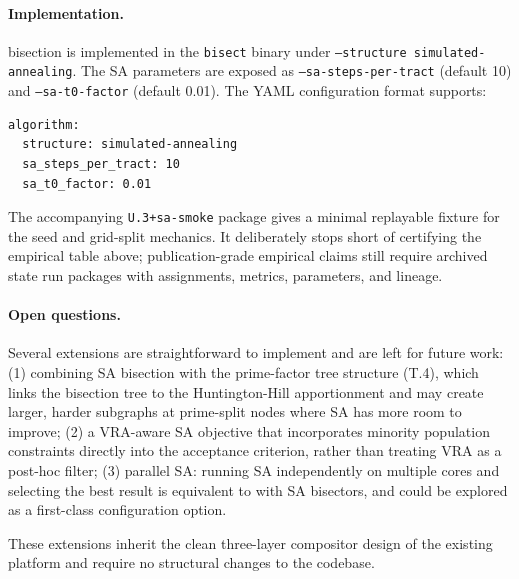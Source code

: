 \paragraph{Implementation.}
\sa{} bisection is implemented in the \texttt{bisect} binary under
\texttt{--structure simulated-annealing}.
The SA parameters are exposed as \texttt{--sa-steps-per-tract} (default 10)
and \texttt{--sa-t0-factor} (default 0.01).
The YAML configuration format supports:
\begin{verbatim}
algorithm:
  structure: simulated-annealing
  sa_steps_per_tract: 10
  sa_t0_factor: 0.01
\end{verbatim}
The accompanying \texttt{U.3+sa-smoke} package gives a minimal replayable
fixture for the seed and grid-split mechanics.  It deliberately stops short of
certifying the empirical table above; publication-grade empirical claims still
require archived state run packages with assignments, metrics, parameters, and
lineage.

\paragraph{Open questions.}
Several extensions are straightforward to implement and are left for future work:
(1) combining SA bisection with the \ar{} prime-factor tree structure (T.4),
    which links the bisection tree to the Huntington-Hill apportionment and
    may create larger, harder subgraphs at prime-split nodes where SA has
    more room to improve;
(2) a VRA-aware SA objective that incorporates minority population constraints
    directly into the acceptance criterion, rather than treating VRA as a
    post-hoc filter;
(3) parallel SA: running SA independently on multiple cores and selecting the
    best result is equivalent to \be{} with SA bisectors, and could be
    explored as a first-class configuration option.

These extensions inherit the clean three-layer compositor design of the
existing platform and require no structural changes to the codebase.
